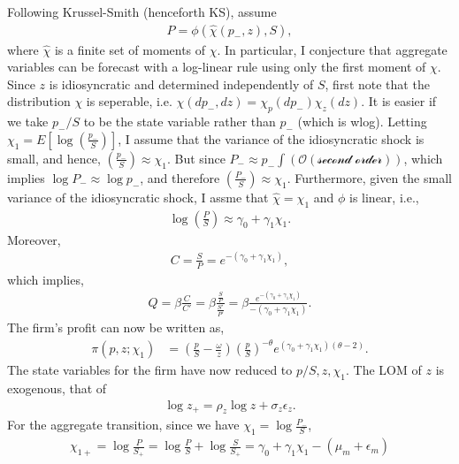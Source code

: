 Following Krussel-Smith (henceforth KS), assume
\begin{align*}
    P = \phi(\hat \chi (p_{-}, z), S),
\end{align*}
where $\hat \chi$ is a finite set of moments of $\chi$. In particular, I conjecture that aggregate variables can be forecast with a log-linear rule using only the first moment of $\chi$. Since $z$ is idiosyncratic and determined independently of $S$, first note that the distribution $\chi$ is seperable, i.e. $\chi(dp_{-}, dz) = \chi_p(dp_{-}) \chi_z(dz)$. It is easier if we take $p_{-}/S$ to be the state variable rather than $p_{-}$ (which is wlog). Letting $\chi_1 = E\left[ \log \left(\frac{p_{-}}{S}\right)\right]$, I assume that the variance of the idiosyncratic shock is small, and hence, $\left(\frac{p_{-}}{S}\right) \approx \chi_1$. But since $P_{-} \approx p_{-} \int (\mathcal{O(\text{second order})})$, which implies $\log P_{-} \approx \log p_{-}$, and therefore $\left(\frac{P_{-}}{S}\right) \approx \chi_1$. Furthermore, given the small variance of the idiosyncratic shock, I assme that $\hat \chi = \chi_1$ and $\phi$ is linear, i.e.,
\begin{align*}
    \log \left( \frac{P}{S}\right) \approx \gamma_0 + \gamma_1\chi_1.
\end{align*}
Moreover,
\begin{align*}
    C = \frac{S}{P} = e^{-(\gamma_0 + \gamma_1 \chi_1)},
\end{align*}
which implies,
\begin{align*}
    Q = \beta\frac{C}{C'} = \beta\frac{\frac{S}{P}}{\frac{S'}{P'}} = \beta \frac{e^{-(\gamma_0 + \gamma_1 \chi_1)}}{-(\gamma_0 + \gamma_1 \chi_1)}.
\end{align*}
The firm's profit can now be written as,
\begin{align*}
    \pi(p, z; \chi_1) &= \left(\frac{p}{S} - \frac{\omega}{z}\right) \left(\frac{p }{S}\right)^{-\theta} e^{(\gamma_0 + \gamma_1\chi_1)(\theta - 2)}.
\end{align*}
The state variables for the firm have now reduced to $p/S, z, \chi_1$. The LOM of $z$ is exogenous, that of
\begin{align*}
    \log z_+ = \rho_z \log z + \sigma_z \epsilon_z.
\end{align*}
For the aggregate transition, since we have $\chi_1 = \log \frac{P_{-}}{S}$,
\begin{align*}
    \chi_{1+} = \log \frac{P}{S_+} = \log \frac{P}{S} + \log \frac{S}{S_+} = \gamma_0 + \gamma_1 \chi_1 - (\mu_m + \epsilon_m)
\end{align*}


